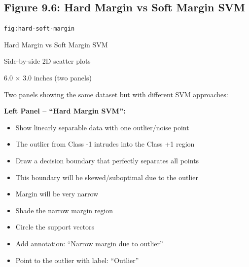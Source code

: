 \documentclass[12pt]{article}
\begin{document}
\newpage

\subsection{Figure 9.6: Hard Margin vs Soft Margin SVM}

\begin{description}[style=nextline, leftmargin=0pt]
    \item[Figure ID] \texttt{fig:hard-soft-margin}
    \item[Title] Hard Margin vs Soft Margin SVM
    \item[Type] Side-by-side 2D scatter plots
    \item[Size] 6.0 $\times$ 3.0 inches (two panels)

    \item[Visual Description]
    Two panels showing the same dataset but with different SVM approaches:

    \textbf{Left Panel -- ``Hard Margin SVM'':}
    \begin{itemize}
        \item Show linearly separable data with one outlier/noise point
        \item The outlier from Class -1 intrudes into the Class +1 region
        \item Draw a decision boundary that perfectly separates all points
        \item This boundary will be skewed/suboptimal due to the outlier
        \item Margin will be very narrow
        \item Shade the narrow margin region
        \item Circle the support vectors
        \item Add annotation: ``Narrow margin due to outlier''
        \item Point to the outlier with label: ``Outlier''
    \end{itemize}


\end{description}
\end{document}
